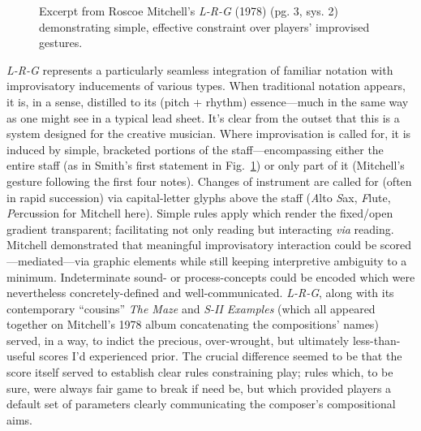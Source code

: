     \begin{figure}
        \centering
        \captionsetup{width=.5\textwidth}
        \caption{Excerpt from Roscoe Mitchell's \textit{L-R-G} (1978) (pg. 3, sys. 2) demonstrating simple, effective constraint over players' improvised gestures.}
        \label{fig:LRGexcerpt}
    \end{figure}

    \textit{L-R-G} represents a particularly seamless integration of familiar notation with improvisatory inducements of various types. When traditional notation appears, it is, in a sense, distilled to its (pitch + rhythm) essence---much in the same way as one might see in a typical lead sheet. It's clear from the outset that this is a system designed for the creative musician. Where improvisation is called for, it is induced by simple, bracketed portions of the staff---encompassing either the entire staff (as in Smith's first statement in Fig.~\ref{fig:LRGexcerpt}) or only part of it (Mitchell's gesture following the first four notes). Changes of instrument are called for (often in rapid succession) via capital-letter glyphs above the staff (\textit{A}lto \textit{S}ax, \textit{F}lute, \textit{P}ercussion for Mitchell here). Simple rules apply which render the fixed/open gradient transparent; facilitating not only reading but interacting \textit{via} reading. Mitchell demonstrated that meaningful improvisatory interaction could be scored---mediated---via graphic elements while still keeping interpretive ambiguity to a minimum. Indeterminate sound- or process-concepts could be encoded which were nevertheless concretely-defined and well-communicated. \textit{L-R-G}, along with its contemporary ``cousins'' \textit{The Maze} and \textit{S-II Examples} (which all appeared together on Mitchell's 1978 album concatenating the compositions' names) served, in a way, to indict the precious, over-wrought, but ultimately less-than-useful scores I'd experienced prior.\autocite{Mitchell_1978} The crucial difference seemed to be that the score itself served to establish clear rules constraining play; rules which, to be sure, were always fair game to break if need be, but which provided players a default set of parameters clearly communicating the composer's compositional aims.

